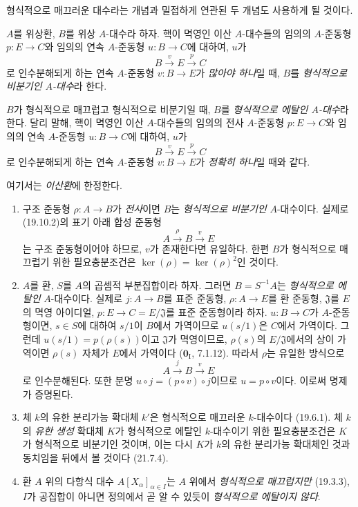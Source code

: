 \begin{env}[19.10.1]
\label{0.19.10.1-ko}
형식적으로 매끄러운 대수라는 개념과 밀접하게 연관된 두 개념도
사용하게 될 것이다.
\end{env}

\begin{definition}[19.10.2]
\label{0.19.10.2-ko}
$A$를 위상환, $B$를 위상 $A$-대수라 하자. 핵이 멱영인 이산
$A$-대수들의 임의의 $A$-준동형 $p:E\to C$와 임의의 연속
$A$-준동형 $u:B\to C$에 대하여, $u$가
\[
  B\xrightarrow{v}E\xrightarrow{p}C
\]
로 인수분해되게 하는 연속 $A$-준동형 $v:B\to E$가
\emph{많아야 하나}일 때, $B$를 \emph{형식적으로 비분기인
$A$-대수}라 한다.

$B$가 형식적으로 매끄럽고 형식적으로 비분기일 때, $B$를
\emph{형식적으로 에탈인 $A$-대수}라 한다. 달리 말해, 핵이 멱영인
이산 $A$-대수들의 임의의 전사 $A$-준동형 $p:E\to C$와 임의의 연속
$A$-준동형 $u:B\to C$에 대하여, $u$가
\[
  B\xrightarrow{v}E\xrightarrow{p}C
\]
로 인수분해되게 하는 연속 $A$-준동형 $v:B\to E$가
\emph{정확히 하나}일 때와 같다.
\end{definition}


\begin{examples}[19.10.3]
\label{0.19.10.3-ko}
여기서는 \emph{이산환}에 한정한다.
\begin{enumerate}
  \item[(i)] 구조 준동형 $\rho:A\to B$가 \emph{전사}이면 $B$는
  \emph{형식적으로 비분기인} $A$-대수이다. 실제로 (19.10.2)의
  표기 아래 합성 준동형
  \[
    A\xrightarrow{\rho}B\xrightarrow{v}E
  \]
  는 구조 준동형이어야 하므로, $v$가 존재한다면 유일하다. 한편
  $B$가 형식적으로 매끄럽기 위한 필요충분조건은
  $\ker(\rho)=\ker(\rho)^2$인 것이다.
  \item[(ii)] $A$를 환, $S$를 $A$의 곱셈적 부분집합이라 하자. 그러면
  $B=S^{-1}A$는 \emph{형식적으로 에탈인} $A$-대수이다. 실제로
  $j:A\to B$를 표준 준동형, $\rho:A\to E$를 환 준동형,
  $\mathfrak J$를 $E$의 멱영 아이디얼,
  $p:E\to C=E/\mathfrak J$를 표준 준동형이라 하자. $u:B\to C$가
  $A$-준동형이면, $s\in S$에 대하여 $s/1$이 $B$에서 가역이므로
  $u(s/1)$은 $C$에서 가역이다. 그런데 $u(s/1)=p(\rho(s))$이고
  $\mathfrak J$가 멱영이므로, $\rho(s)$의 $E/\mathfrak J$에서의 상이
  가역이면 $\rho(s)$ 자체가 $E$에서 가역이다
  ($\mathbf 0_{\mathrm I}$, 7.1.12). 따라서 $\rho$는 유일한 방식으로
  \[
    A\xrightarrow{j}B\xrightarrow{v}E
  \]
  로 인수분해된다. 또한 분명
  $u\circ j=(p\circ v)\circ j$이므로 $u=p\circ v$이다. 이로써 명제가
  증명된다.
  \item[(iii)] 체 $k$의 유한 분리가능 확대체 $k'$은 형식적으로
  매끄러운 $k$-대수이다 (19.6.1). 체 $k$의 \emph{유한 생성} 확대체
  $K$가 형식적으로 에탈인 $k$-대수이기 위한 필요충분조건은 $K$가
  형식적으로 비분기인 것이며, 이는 다시 $K$가 $k$의 유한 분리가능
  확대체인 것과 동치임을 뒤에서 볼 것이다 (21.7.4).
  \item[(iv)] 환 $A$ 위의 다항식 대수 $A[X_\alpha]_{\alpha\in I}$는
  $A$ 위에서 \emph{형식적으로 매끄럽지만} (19.3.3), $I$가 공집합이
  아니면 정의에서 곧 알 수 있듯이 \emph{형식적으로 에탈이지 않다}.
\end{enumerate}
\end{examples}

